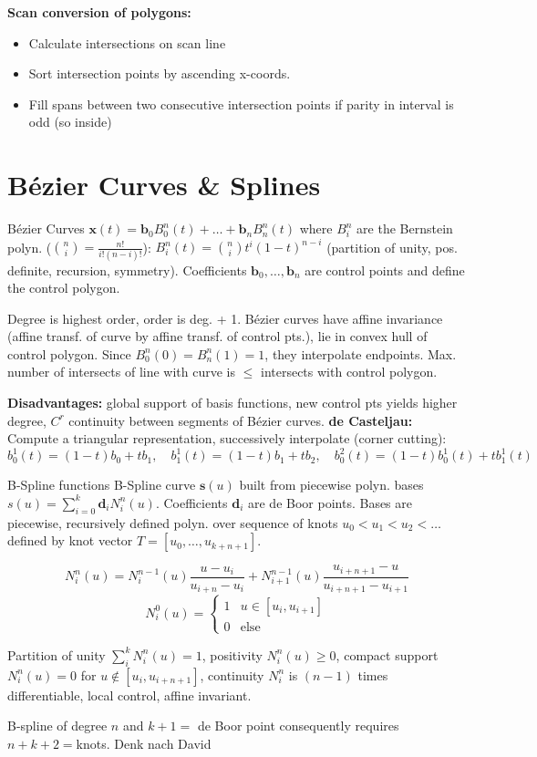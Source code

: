 \documentclass[a4paper,9pt]{article}
\begin{document}
\textbf{Scan conversion of polygons:}
\begin{itemize}
  \item Calculate intersections on scan line
  \item Sort intersection points by ascending x-coords.
  \item Fill spans between two consecutive intersection points if parity in interval is odd (so inside)
\end{itemize}

\section{B\'ezier Curves \& Splines}
\begin{subbox}{B\'ezier Curves}
$\mathbf{x}(t) = \mathbf{b}_0 B_0^n(t) + \dots + \mathbf{b}_n B_n^n(t)$ where $B_i^n$ are the Bernstein polyn. ($\binom{n}{i} = \frac{n!}{i!(n-i)!}$): $B_i^n(t) = \binom{n}{i} t^i (1-t)^{n-i}$ (partition of unity, pos. definite, recursion, symmetry). Coefficients $\mathbf{b}_0, \dots, \mathbf{b}_n$ are control points and define the control polygon.

Degree is highest order, order is deg. + 1. B\'ezier curves have affine invariance (affine transf. of curve by affine transf. of control pts.), lie in convex hull of control polygon. Since $B_0^n(0)=B_n^n(1)=1$, they interpolate endpoints. Max. number of intersects of line with curve is $\le$ intersects with control polygon.
\end{subbox}
\textbf{Disadvantages:} global support of basis functions, new control pts yields higher degree, $C^r$ continuity between segments of B\'ezier curves.
\textbf{de Casteljau:} Compute a triangular representation, successively interpolate (corner cutting):
$$
b_0^1(t) = (1 - t) b_0 + t b_1,\quad b_1^1(t) = (1 - t) b_1 + t b_2,\quad b_0^2(t) = (1 - t) b_0^1(t) + t b_1^1(t)
$$

\begin{subbox}{B-Spline functions}
B-Spline curve $\mathbf{s}(u)$ built from piecewise polyn. bases $s(u) = \sum_{i=0}^k \mathbf{d}_i N_i^n(u)$. Coefficients $\mathbf{d}_i$ are de Boor points. Bases are piecewise, recursively defined polyn. over sequence of knots $u_0 < u_1 < u_2 < \dots$ defined by knot vector $T = [u_0, \dots, u_{k+n+1}]$.

$$N_i^n(u) = N_i^{n-1}(u) \frac{u-u_i}{u_{i+n}-u_i} + N_{i+1}^{n-1}(u) \frac{u_{i+n+1}-u}{u_{i+n+1}-u_{i+1}}$$
$$N_i^0(u) = \begin{cases} 1 & u \in [u_i, u_{i+1}] \\ 0 & \text{else} \end{cases}$$

Partition of unity $\sum_i^k N_i^n(u) = 1$, positivity $N_i^n(u) \ge 0$, compact support $N_i^n(u) = 0$ for $u \notin [u_i, u_{i+n+1}]$, continuity $N_i^n$ is $(n-1)$ times differentiable, local control, affine invariant.
\end{subbox}
\begin{subbox}
B-spline of degree $n$ and $k +1=$ de Boor point consequently requires $n+k+2=$knots. Denk nach David 
\end{subbox}
\end{document}

